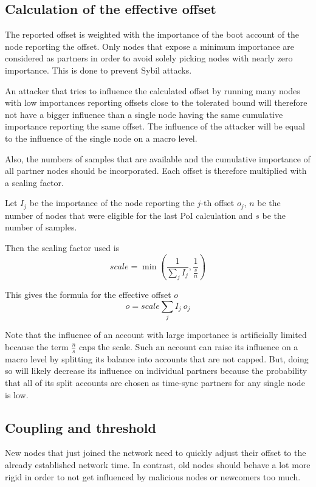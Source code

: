 \subsection{Calculation of the effective offset}

The reported offset is weighted with the importance of the boot account of the node reporting the offset.
Only nodes that expose a minimum importance are considered as partners in order to avoid solely picking nodes with nearly zero importance.
This is done to prevent Sybil attacks.

An attacker that tries to influence the calculated offset by running many nodes with low importances reporting offsets close to the tolerated bound will therefore not have a bigger influence than a single node having the same cumulative importance reporting the same offset.
The influence of the attacker will be equal to the influence of the single node on a macro level.

Also, the numbers of samples that are available and the cumulative importance of all partner nodes should be incorporated.
Each offset is therefore multiplied with a scaling factor.

Let $I_j$ be the importance of the node reporting the $j$-th offset $o_j$,
$\textit{n}$ be the number of nodes that were eligible for the last PoI calculation and $\textit{s}$ be the number of samples.

Then the scaling factor used is
$$ \textit{scale} = \min\left(\frac{1}{\sum_j I_j}, \frac{1}{\frac{\textit{s}}{\textit{n}}}\right)$$

This gives the formula for the effective offset $o$
$$ o = scale \sum_j I_j \: o_j$$

Note that the influence of an account with large importance is artificially limited because the term $\frac{\textit{n}}{\textit{s}} $ caps the scale.
Such an account can raise its influence on a macro level by splitting its balance into accounts that are not capped.
But, doing so will likely decrease its influence on individual partners because the probability that all of its split accounts are chosen as time-sync partners for any single node is low.

\subsection{Coupling and threshold}

New nodes that just joined the network need to quickly adjust their offset to the already established network time. In contrast, old nodes should behave a lot more rigid in order to not get influenced by malicious nodes or newcomers too much.

